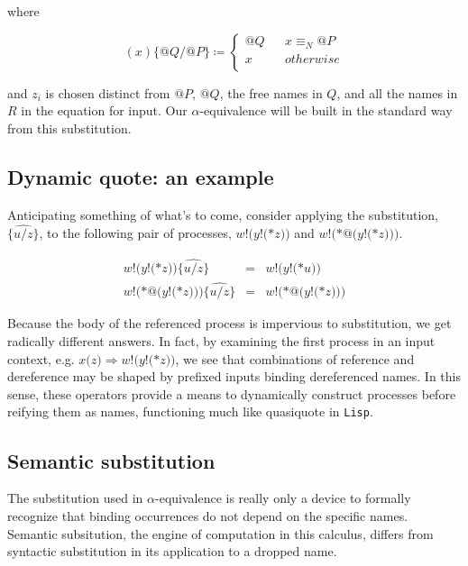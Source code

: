 \documentclass[]{amsart}
\makeatletter
\newcommand{\nameeq}{\mathbin{\equiv_N}}
\newcommand{\quotep}[1]{@#1}
\newcommand{\defneqls}{\coloneqq}
\theoremstyle{definition}
\theoremstyle{remark}
\numberwithin{equation}{subsection}
\makeatother
\begin{document}
where

\begin{equation*}
(x){\{} {@}Q / {@}P {\}}            \defneqls 
		\left\{ 
			\begin{array}{ccc}
				{@}Q & & x \nameeq {@}P \\
                                x & & otherwise \\
			\end{array}
		\right.
\end{equation*}

and $z_i$ is chosen distinct from $\quotep{P}$, $\quotep{Q}$, the free
names in $Q$, and all the names in $R$ in the equation for input. Our
$\alpha$-equivalence will be built in the standard way from this
substitution.

\subsection{ Dynamic quote: an example }

Anticipating something of what's to come, consider applying the
substitution, $\widehat{{\{}u / z {\}}}$, to the following pair
of processes, ${w}{!}{(}{y}{!}{(}{*}{z}{)}{)}$ and ${w}{!}{(}{*}{@}({y}{!}{(}{*z}{)}{)}{)}$.

\begin{eqnarray*}
	{w}{!}{(}{y}{!}{(}{*}{z}{)}{)}\widehat{{\{}u / z{\}}}
		& = &
		{w}{!}{(}{y}{!}{(}{*}u{)}{)} \\
       {w}{!}{(}{*}{@}({y}{!}{(}{*z}{)}{)}{)}\widehat{{\{}u / z{\}} }
		& = &
		{w}{!}{(}{*}{@}({y}{!}{(}{*z}{)}{)}{)}
\end{eqnarray*}

Because the body of the referenced process is impervious to
substitution, we get radically different answers. In fact, by
examining the first process in an input context, e.g. $x{(}{z}{)}
\Rightarrow {w}{!}{(}{y}{!}{(}{*}{z}{)}{)}$, we see that combinations
of reference and dereference may be shaped by prefixed inputs binding
dereferenced names. In this sense, these operators provide a means to
dynamically construct processes before reifying them as names,
functioning much like quasiquote in {\tt Lisp}.

\subsection{Semantic substitution}

The substitution used in $\alpha$-equivalence is really only a device
to formally recognize that binding occurrences do not depend on the
specific names. Semantic subsitution, the engine of computation in
this calculus, differs from syntactic substitution in its application
to a dropped name.
\end{document}
